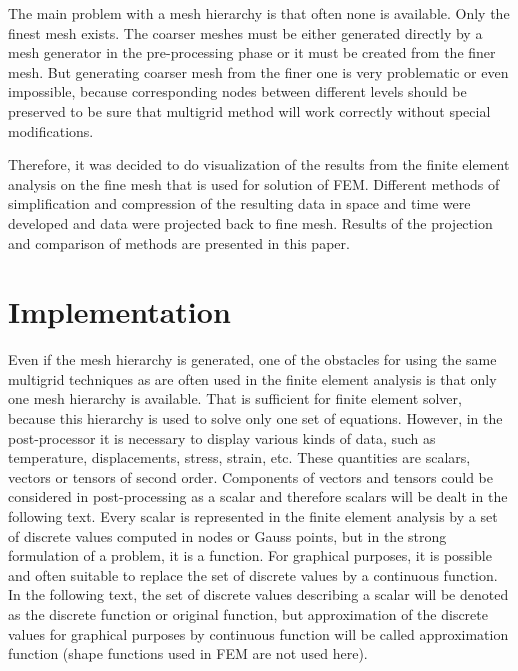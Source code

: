 The main problem with a mesh hierarchy is that often none is available. Only the finest mesh exists. The coarser meshes must be either generated directly by a mesh generator \cite{Frey2000,Rypl1998} in the pre-processing phase or it must be created from the finer mesh. But generating coarser mesh from the finer one is very problematic or even impossible, because corresponding nodes between different levels should be preserved to be sure that multigrid method will work correctly without special modifications.

Therefore, it was decided to do visualization of the results from the finite element analysis on the fine mesh that is used for solution of FEM. Different methods of simplification and compression of the resulting data in space and time were developed and data were projected back to fine mesh. Results of the projection and comparison of methods are presented in this paper.


\section{Implementation}

Even if the mesh hierarchy is generated, one of the obstacles for using the same multigrid techniques as are often used in the finite element analysis is that only one mesh hierarchy is available. That is sufficient for finite element solver, because this hierarchy is used to solve only one set of equations. However, in the post-processor it is necessary to display various kinds of data, such as temperature, displacements, stress, strain, etc. These quantities are scalars, vectors or tensors of second order. Components of vectors and tensors could be considered in post-processing as a scalar and therefore scalars will be dealt in the following text. Every scalar is represented in the finite element analysis by a set of discrete values computed in nodes or Gauss points, but in the strong formulation of a problem, it is a function. For graphical purposes, it is possible and often suitable to replace the set of discrete values by a continuous function. In the following text, the set of discrete values describing a scalar will be denoted as the discrete function or original function, but approximation of the discrete values for graphical purposes by continuous function will be called approximation function (shape functions used in FEM are not used here).

